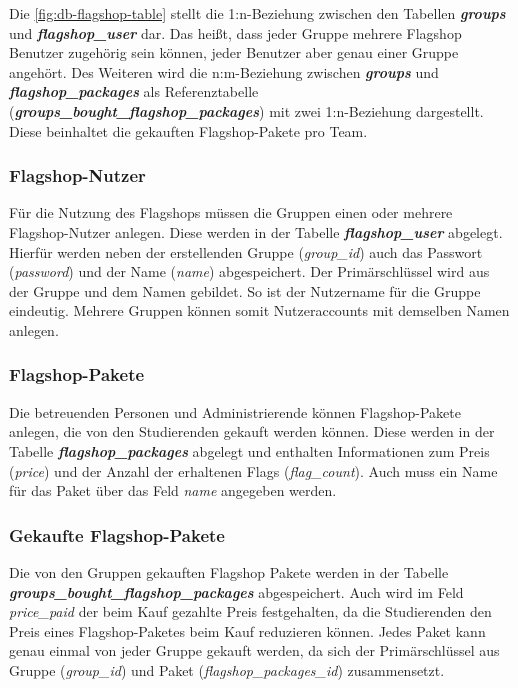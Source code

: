 Die \autoref{fig:db-flagshop-table} stellt die 1:n-Beziehung zwischen den Tabellen \textbf{\textit{groups}} und \textbf{\textit{flagshop\_user}} dar. Das heißt, dass jeder Gruppe mehrere Flagshop Benutzer zugehörig sein können, jeder Benutzer aber genau einer Gruppe angehört. Des Weiteren wird die n:m-Beziehung zwischen \textbf{\textit{groups}} und \textbf{\textit{flagshop\_packages}} als Referenztabelle\\ (\textbf{\textit{groups\_bought\_flagshop\_packages}}) mit zwei 1:n-Beziehung dargestellt. Diese beinhaltet die gekauften Flagshop-Pakete pro Team.

\subsubsection{Flagshop-Nutzer}
Für die Nutzung des Flagshops müssen die Gruppen einen oder mehrere Flagshop-Nutzer anlegen. Diese werden in der Tabelle \textbf{\textit{flagshop\_user}} abgelegt. Hierfür werden neben der erstellenden Gruppe (\textit{group\_id}) auch das Passwort (\textit{password}) und der Name (\textit{name}) abgespeichert. Der Primärschlüssel wird aus der Gruppe und dem Namen gebildet. So ist der Nutzername für die Gruppe eindeutig. Mehrere Gruppen können somit Nutzeraccounts mit demselben Namen anlegen.

\subsubsection{Flagshop-Pakete}
Die betreuenden Personen und Administrierende können Flagshop-Pakete anlegen, die von den Studierenden gekauft werden können. Diese werden in der Tabelle \textbf{\textit{flagshop\_packages}} abgelegt und enthalten Informationen zum Preis (\textit{price}) und der Anzahl der erhaltenen Flags (\textit{flag\_count}). Auch muss ein Name für das Paket über das Feld \textit{name} angegeben werden.

\subsubsection{Gekaufte Flagshop-Pakete}
Die von den Gruppen gekauften Flagshop Pakete werden in der Tabelle\\ \textbf{\textit{groups\_bought\_flagshop\_packages}} abgespeichert. Auch wird im Feld \textit{price\_paid} der beim Kauf gezahlte Preis festgehalten, da die Studierenden den Preis eines Flagshop-Paketes beim Kauf reduzieren können. Jedes Paket kann genau einmal von jeder Gruppe gekauft werden, da sich der Primärschlüssel aus Gruppe (\textit{group\_id}) und Paket (\textit{flagshop\_packages\_id}) zusammensetzt.

